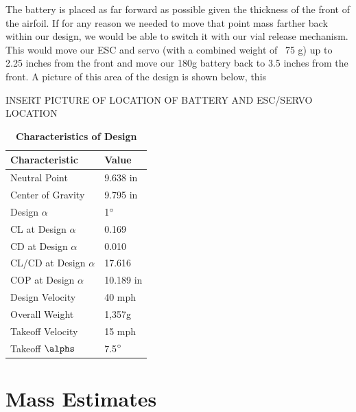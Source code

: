 The battery is placed as far forward as possible given the thickness of the front of the airfoil. If for any reason we needed to move that point mass farther back within our design, we would be able to switch it with our vial release mechanism. This would move our ESC and servo (with a combined weight of ~75 g) up to 2.25 inches from the front and move our 180g battery back to 3.5 inches from the front. A picture of this area of the design is shown below, this 

INSERT PICTURE OF LOCATION OF BATTERY AND ESC/SERVO LOCATION

\begin{table}[H]
        \begin{center}
        \caption{\textbf{Characteristics of Design}} \label{table:Weights}
        \begin{tabular}{|p{1.4in}|p{1in}|} %
        \hline
            \textbf{Characteristic} & \textbf{Value} \\ \hline
            Neutral Point & 9.638 in \\ \hline
            Center of Gravity & 9.795 in \\ \hline
            Design $\alpha$ & 1$\degree$ \\ \hline
            CL at Design $\alpha$ & 0.169 \\ \hline
            CD at Design $\alpha$ & 0.010 \\ \hline
            CL/CD at Design $\alpha$ & 17.616 \\ \hline
            COP at Design $\alpha$ & 10.189 in \\ \hline
            Design Velocity & 40 mph \\ \hline
            Overall Weight & 1,357g \\ \hline
            Takeoff Velocity & 15 mph \\ \hline
            Takeoff $\alphs$ & 7.5$\degree$ \\ \hline
        \end{tabular}
        \end{center}
    \end{table}


\section{Mass Estimates}

